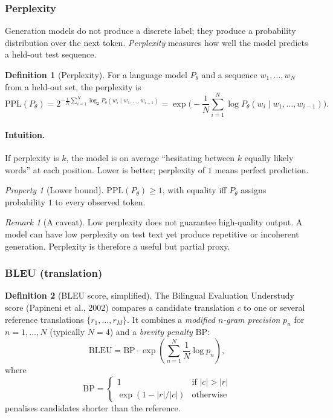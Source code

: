 \documentclass[12pt,a4paper]{report}
\theoremstyle{definition}
\newtheorem{definition}{Definition}[section]
\theoremstyle{remark}
\newtheorem{remark}{Remark}[section]
\newtheorem{property}{Property}[section]
\begin{document}
\subsubsection*{Perplexity}

Generation models do not produce a discrete label; they produce a probability distribution over the next token. \emph{Perplexity} measures how well the model predicts a held-out test sequence.

\begin{definition}[Perplexity]
For a language model $P_\theta$ and a sequence $w_1, \dots, w_N$ from a held-out set, the perplexity is
\[ \mathrm{PPL}(P_\theta) = 2^{-\frac{1}{N} \sum_{i=1}^{N} \log_2 P_\theta(w_i \mid w_1, \dots, w_{i-1})} = \exp\Big(- \frac{1}{N} \sum_{i=1}^{N} \log P_\theta(w_i \mid w_1, \dots, w_{i-1})\Big). \]
\end{definition}

\paragraph{Intuition.} If perplexity is $k$, the model is on average ``hesitating between $k$ equally likely words'' at each position. Lower is better; perplexity of $1$ means perfect prediction.

\begin{property}[Lower bound]
$\mathrm{PPL}(P_\theta) \ge 1$, with equality iff $P_\theta$ assigns probability $1$ to every observed token.
\end{property}

\begin{remark}[A caveat]
Low perplexity does not guarantee high-quality output. A model can have low perplexity on test text yet produce repetitive or incoherent generation. Perplexity is therefore a useful but partial proxy.
\end{remark}

\subsubsection*{BLEU (translation)}

\begin{definition}[BLEU score, simplified]
The Bilingual Evaluation Understudy score (Papineni et al., 2002) compares a candidate translation $c$ to one or several reference translations $\{r_1, \dots, r_M\}$. It combines a \emph{modified $n$-gram precision} $p_n$ for $n = 1, \dots, N$ (typically $N = 4$) and a \emph{brevity penalty} $\mathrm{BP}$:
\[ \mathrm{BLEU} = \mathrm{BP} \cdot \exp\!\left( \sum_{n=1}^{N} \frac{1}{N} \log p_n \right), \]
where
\[ \mathrm{BP} = \begin{cases} 1 & \text{if } |c| > |r| \\ \exp(1 - |r| / |c|) & \text{otherwise} \end{cases} \]
penalises candidates shorter than the reference.
\end{definition}
\end{document}
